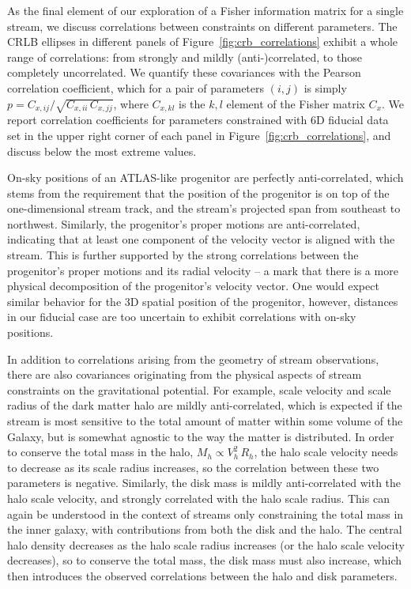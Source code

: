 \documentclass[modern]{aastex62}
\begin{document}
As the final element of our exploration of a Fisher information matrix for a single stream, we discuss correlations between constraints on different parameters.
The CRLB ellipses in different panels of Figure~\ref{fig:crb_correlations} exhibit a whole range of correlations: from strongly and mildly (anti-)correlated, to those completely uncorrelated.
We quantify these covariances with the Pearson correlation coefficient, which for a pair of parameters $(i,j)$ is simply $p = C_{x,ij} / \sqrt{C_{x,ii}\,C_{x,jj}}$, where $C_{x,kl}$ is the $k,l$ element of the Fisher matrix $C_x$.
We report correlation coefficients for parameters constrained with 6D fiducial data set in the upper right corner of each panel in Figure~\ref{fig:crb_correlations}, and discuss below the most extreme values.

On-sky positions of an ATLAS-like progenitor are perfectly anti-correlated, which stems from the requirement that the position of the progenitor is on top of the one-dimensional stream track, and the stream's projected span from southeast to northwest.
Similarly, the progenitor's proper motions are anti-correlated, indicating that at least one component of the velocity vector is aligned with the stream.
This is further supported by the strong correlations between the progenitor's proper motions and its radial velocity -- a mark that there is a more physical decomposition of the progenitor's velocity vector.
One would expect similar behavior for the 3D spatial position of the progenitor, however, distances in our fiducial case are too uncertain to exhibit correlations with on-sky positions.

In addition to correlations arising from the geometry of stream observations, there are also covariances originating from the physical aspects of stream constraints on the gravitational potential.
For example, scale velocity and scale radius of the dark matter halo are mildly anti-correlated, which is expected if the stream is most sensitive to the total amount of matter within some volume of the Galaxy, but is somewhat agnostic to the way the matter is distributed.
In order to conserve the total mass in the halo, $M_h \propto V_h^2\,R_h$, the halo scale velocity needs to decrease as its scale radius increases, so the correlation between these two parameters is negative.
Similarly, the disk mass is mildly anti-correlated with the halo scale velocity, and strongly correlated with the halo scale radius.
This can again be understood in the context of streams only constraining the total mass in the inner galaxy, with contributions from both the disk and the halo.
The central halo density decreases as the halo scale radius increases (or the halo scale velocity decreases), so to conserve the total mass, the disk mass must also increase, which then introduces the observed correlations between the halo and disk parameters. 
\end{document}
